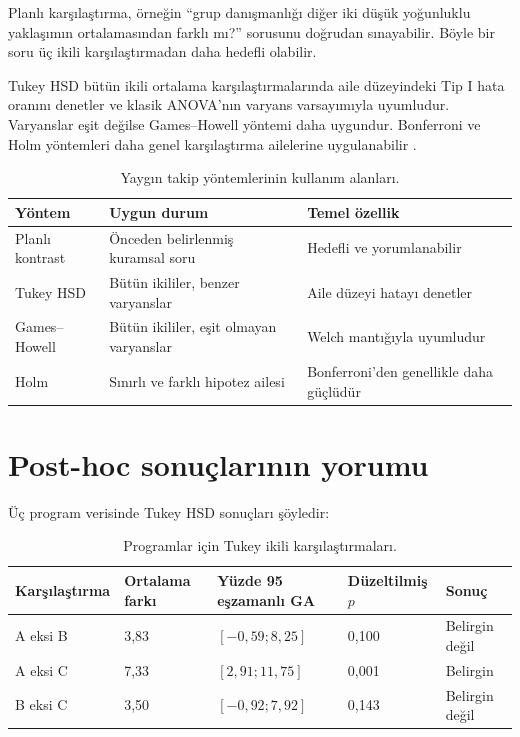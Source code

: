 Planlı karşılaştırma, örneğin ``grup danışmanlığı diğer iki düşük yoğunluklu
yaklaşımın ortalamasından farklı mı?'' sorusunu doğrudan sınayabilir. Böyle bir
soru üç ikili karşılaştırmadan daha hedefli olabilir.

Tukey HSD bütün ikili ortalama karşılaştırmalarında aile düzeyindeki Tip I
hata oranını denetler ve klasik ANOVA'nın varyans varsayımıyla uyumludur.
Varyanslar eşit değilse Games--Howell yöntemi daha uygundur. Bonferroni ve
Holm yöntemleri daha genel karşılaştırma ailelerine uygulanabilir
\cite{tukey1953,maxwell2018}.

\begin{table}[htbp]
\centering
\caption{Yaygın takip yöntemlerinin kullanım alanları.}
\begin{tabular}{@{}p{}p{}p{}@{}}
\toprule
Yöntem & Uygun durum & Temel özellik \\
\midrule
Planlı kontrast & Önceden belirlenmiş kuramsal soru & Hedefli ve yorumlanabilir \\
Tukey HSD & Bütün ikililer, benzer varyanslar & Aile düzeyi hatayı denetler \\
Games--Howell & Bütün ikililer, eşit olmayan varyanslar & Welch mantığıyla uyumludur \\
Holm & Sınırlı ve farklı hipotez ailesi & Bonferroni'den genellikle daha güçlüdür \\
\bottomrule
\end{tabular}
\end{table}

\section{Post-hoc sonuçlarının yorumu}

Üç program verisinde Tukey HSD sonuçları şöyledir:

\begin{table}[htbp]
\centering
\caption{Programlar için Tukey ikili karşılaştırmaları.}
\begingroup\scriptsize
\begin{tabular}{@{}p{}p{}p{}p{}p{}@{}}
\toprule
Karşılaştırma & Ortalama farkı & Yüzde 95 eşzamanlı GA & Düzeltilmiş $p$ & Sonuç \\
\midrule
A eksi B & 3,83 & $[-0{,}59;8{,}25]$ & 0,100 & Belirgin değil \\
A eksi C & 7,33 & $[2{,}91;11{,}75]$ & 0,001 & Belirgin \\
B eksi C & 3,50 & $[-0{,}92;7{,}92]$ & 0,143 & Belirgin değil \\
\bottomrule
\end{tabular}
\endgroup
\end{table}

